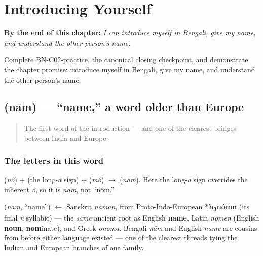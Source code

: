 
\chapter{Introducing Yourself}
\label{ch:introductions}

\begin{chapteropening}
\textbf{By the end of this chapter:} \emph{I can introduce myself in Bengali, give my name, and understand the other person's name.}

Complete BN-C02-practice, the canonical closing checkpoint, and demonstrate the chapter promise: introduce myself in Bengali, give my name, and understand the other person's name.
\end{chapteropening}

\section[\texorpdfstring{\bn{নাম} (nām)}{নাম (nām)}]{ (nām) — \textquotedblleft{}name,\textquotedblright{} a word older than Europe}

\label{lesson:BN-C02-naam}



\begin{quote}
The first word of the introduction — and one of the clearest bridges between India and Europe.
\end{quote}

\subsection*{The letters in this word}
\textbf{} (\emph{nô}) + \textbf{} (the long-\emph{ā} sign) + \textbf{} (\emph{mô}) $\to$ \textbf{} (\emph{nām}). Here the long-\emph{ā} sign overrides the inherent \emph{ô}, so it is \emph{nām}, not \textquotedblleft{}nôm.\textquotedblright{}

\begin{cousinweb}
\textbf{} (\emph{nām}, \textquotedblleft{}name\textquotedblright{}) $\leftarrow$ Sanskrit \emph{nāman}, from Proto-Indo-European \textbf{*h\textsubscript{3}nómn} (its final \emph{n} syllabic) — the \emph{same} ancient root as English \textbf{name}, Latin \emph{nōmen} (English \textbf{noun}, \textbf{nom}inate), and Greek \emph{onoma}. Bengali \emph{nām} and English \emph{name} are cousins from before either language existed — one of the clearest threads tying the Indian and European branches of one family.
\end{cousinweb}

